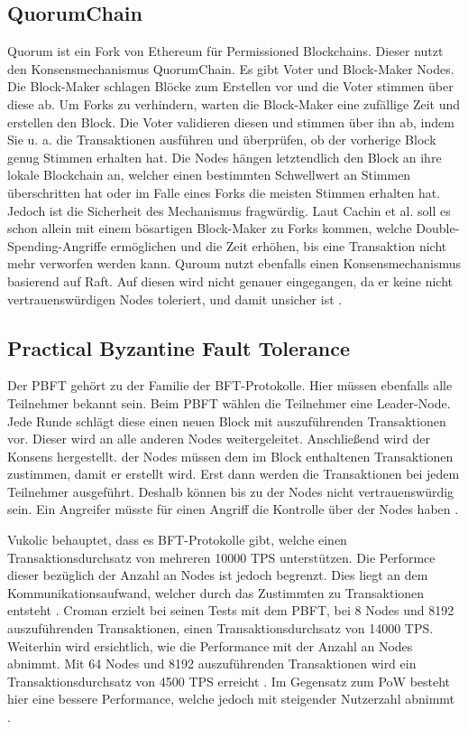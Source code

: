 \subsection{QuorumChain}
Quorum ist ein Fork von Ethereum für Permissioned Blockchains. Dieser nutzt den Konsensmechanismus QuorumChain. Es gibt Voter und Block-Maker Nodes. Die Block-Maker schlagen Blöcke zum Erstellen vor und die Voter stimmen über diese ab. Um Forks zu verhindern, warten die Block-Maker eine zufällige Zeit und erstellen den Block. Die Voter validieren diesen und stimmen über ihn ab, indem Sie u. a. die Transaktionen ausführen und überprüfen, ob der vorherige Block genug Stimmen erhalten hat. Die Nodes hängen letztendlich den Block an ihre lokale Blockchain an, welcher einen bestimmten Schwellwert an Stimmen überschritten hat oder im Falle eines Forks die meisten Stimmen erhalten hat. Jedoch ist die Sicherheit des Mechanismus fragwürdig. Laut Cachin et al. soll es schon allein mit einem bösartigen Block-Maker zu Forks kommen, welche Double-Spending-Angriffe ermöglichen und die Zeit erhöhen, bis eine Transaktion nicht mehr verworfen werden kann. Quroum nutzt ebenfalls einen Konsensmechanismus basierend auf Raft. Auf diesen wird nicht genauer eingegangen, da er keine nicht vertrauenswürdigen Nodes toleriert, und damit unsicher ist \cite{CachinBlockchainConsensusProtocols2017}.

\subsection{Practical Byzantine Fault Tolerance}
Der \acs{PBFT} gehört zu der Familie der \acs{BFT}-Protokolle. Hier müssen ebenfalls alle Teilnehmer bekannt sein. Beim \acs{PBFT} wählen die Teilnehmer eine Leader-Node. Jede Runde schlägt diese einen neuen Block mit auszuführenden Transaktionen vor. Dieser wird an alle anderen Nodes weitergeleitet. Anschließend wird der Konsens hergestellt.  der Nodes müssen dem im Block enthaltenen Transaktionen zustimmen, damit er erstellt wird. Erst dann werden die Transaktionen bei jedem Teilnehmer ausgeführt. Deshalb können bis zu  der Nodes nicht vertrauenswürdig sein. Ein Angreifer müsste für einen Angriff die Kontrolle über  der Nodes haben \cite{SukhwaniPerformanceModelingPBFT2017a}\cite{ZhengBlockchainChallengesOpportunities2017}. 

Vukolic behauptet, dass es \acs{BFT}-Protokolle gibt, welche einen Transaktionsdurchsatz von mehreren 10000 \acs{TPS} unterstützen. Die Performce dieser bezüglich der Anzahl an Nodes ist jedoch begrenzt. Dies liegt an dem Kommunikationsaufwand, welcher durch das Zustimmten zu Transaktionen entsteht \cite{Vukolicquestscalableblockchain2015}. Croman erzielt bei seinen Tests mit dem \acs{PBFT}, bei 8 Nodes und 8192 auszuführenden Transaktionen, einen Transaktionsdurchsatz von 14000 \acs{TPS}. Weiterhin wird ersichtlich, wie die Performance mit der Anzahl an Nodes abnimmt. Mit 64 Nodes und 8192 auszuführenden Transaktionen wird ein Transaktionsdurchsatz von 4500 \acs{TPS} erreicht \cite{CromanScalingDecentralizedBlockchains2016}. Im Gegensatz zum \acs{PoW} besteht hier eine bessere Performance, welche jedoch mit steigender Nutzerzahl abnimmt \cite{Vukolicquestscalableblockchain2015}.

